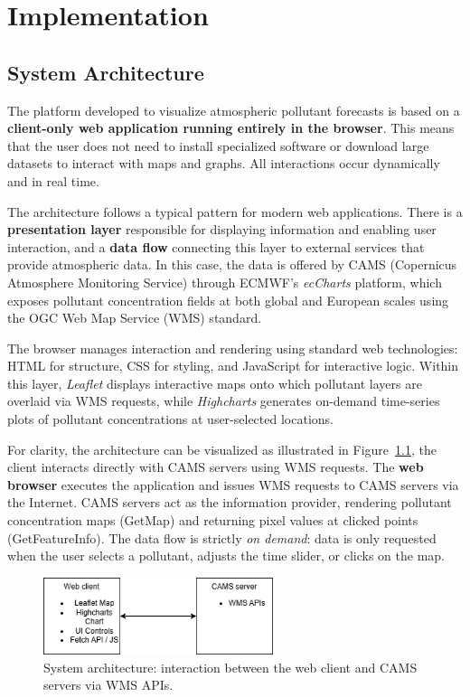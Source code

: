 \chapter[Implementation]{Implementation}
\label{Chap3}

\section{System Architecture}

The platform developed to visualize atmospheric pollutant forecasts is based on a \textbf{client-only web application running entirely in the browser}. This means that the user does not need to install specialized software or download large datasets to interact with maps and graphs. All interactions occur dynamically and in real time.

The architecture follows a typical pattern for modern web applications. There is a \textbf{presentation layer} responsible for displaying information and enabling user interaction, and a \textbf{data flow} connecting this layer to external services that provide atmospheric data. In this case, the data is offered by CAMS (Copernicus Atmosphere Monitoring Service) through ECMWF’s \emph{ecCharts} platform, which exposes pollutant concentration fields at both global and European scales using the OGC Web Map Service (WMS) standard.

The browser manages interaction and rendering using standard web technologies: HTML for structure, CSS for styling, and JavaScript for interactive logic. Within this layer, \emph{Leaflet} displays interactive maps onto which pollutant layers are overlaid via WMS requests, while \emph{Highcharts} generates on-demand time-series plots of pollutant concentrations at user-selected locations.

For clarity, the architecture can be visualized as illustrated in Figure~\ref{fig:architecture}, the client interacts directly with CAMS servers using WMS requests. The \textbf{web browser} executes the application and issues WMS requests to CAMS servers via the Internet. CAMS servers act as the information provider, rendering pollutant concentration maps (GetMap) and returning pixel values at clicked points (GetFeatureInfo). The data flow is strictly \textit{on demand}: data is only requested when the user selects a pollutant, adjusts the time slider, or clicks on the map.


\begin{figure}[h!btp]
	\centering
	\includegraphics[width=0.6\textwidth]{fig/diagrama1.png}
	\caption{System architecture: interaction between the web client and CAMS servers via WMS APIs.}
	\label{fig:architecture}
\end{figure}

